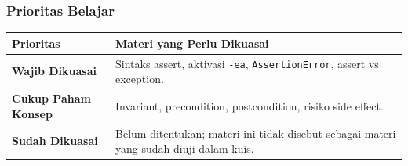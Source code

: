 \subsubsection{Prioritas Belajar}

\begin{tabularx}{\textwidth}{|L{0.22\textwidth}|X|}
\hline
\textbf{Prioritas} & \textbf{Materi yang Perlu Dikuasai} \\
\hline
\textbf{Wajib Dikuasai} & Sintaks assert, aktivasi \texttt{-ea}, \texttt{AssertionError}, assert vs exception. \\
\hline
\textbf{Cukup Paham Konsep} & Invariant, precondition, postcondition, risiko side effect. \\
\hline
\textbf{Sudah Dikuasai} & Belum ditentukan; materi ini tidak disebut sebagai materi yang sudah diuji dalam kuis. \\
\hline
\end{tabularx}
